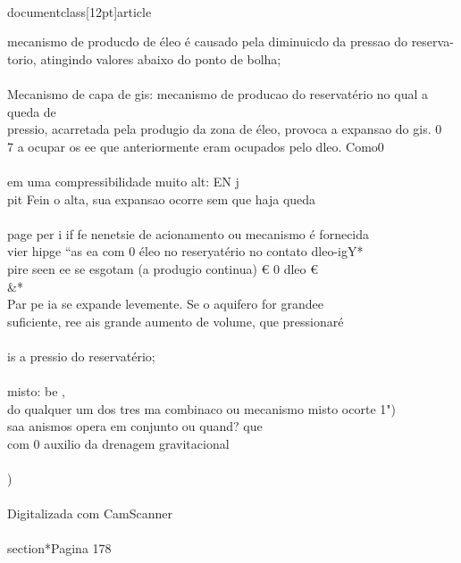 \\documentclass[12pt]{article}
\begin{document}
{mecanismo de producdo de éleo é causado pela diminuicdo da pressao do reserva-\\
torio, atingindo valores abaixo do ponto de bolha;\\
\\
Mecanismo de capa de gis: mecanismo de producao do reservatério no qual a queda de\\
pressio, acarretada pela produgio da zona de éleo, provoca a expansao do gis. 0\\
7 a ocupar os ee que anteriormente eram ocupados pelo dleo. Como0\\
\\
em uma compressibilidade muito alt: EN j\\
pit Fein o alta, sua expansao ocorre sem que haja queda\\
\\
page per i if fe nenetsie de acionamento ou mecanismo é fornecida\\
vier hipge “as ea com 0 éleo no reseryatério no contato dleo-igY*\\
pire seen ee se esgotam (a produgio continua) € 0 dleo €\\&*\\
Par pe ia se expande levemente. Se o aquifero for grandee\\
suficiente, ree ais grande aumento de volume, que pressionaré\\
\\
is a pressio do reservatério;\\
\\
misto: be ,\\
do qualquer um dos tres ma combinaco ou mecanismo misto ocorte 1")\\
saa anismos opera em conjunto ou quand? que\\
com 0 auxilio da drenagem gravitacional\\
\\
)\\
\\
Digitalizada com CamScanner\\

\\section*{Pagina 178}

}
\end{document}
